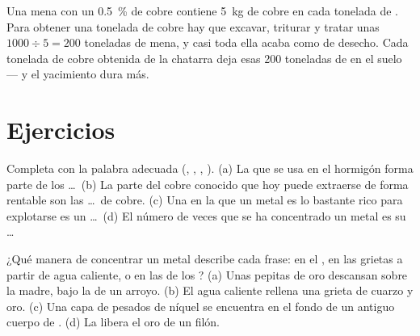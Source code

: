 \begin{example}\label{ex:g9:earth-resources:recycling}
Una mena con un \qty{0.5}{\%} de cobre contiene \qty{5}{kg} de cobre en
cada tonelada de . Para obtener una tonelada de cobre hay que
excavar, triturar y tratar unas $1000 \div 5 = 200$ toneladas de mena, y
casi toda ella acaba como  de desecho. Cada tonelada de cobre obtenida
de la chatarra deja esas 200 toneladas de  en el suelo --- y el
yacimiento dura más.
\end{example}


\section{Ejercicios}

\begin{exercise}[$\star$]\label{exo:g9:earth-resources:1}
Completa con la palabra adecuada (, , , ). (a) La  que se usa en el hormigón
forma parte de los \ldots\ (b) La parte del cobre conocido que hoy puede
extraerse de forma rentable son las \ldots\ de cobre. (c) Una  en la
que un metal es lo bastante rico para explotarse es un \ldots\ (d) El
número de veces que se ha concentrado un metal es su \ldots
\end{exercise}

\begin{exercise}[$\star$]\label{exo:g9:earth-resources:2}
¿Qué manera de concentrar un metal describe cada frase: en el , en
las grietas a partir de agua caliente, o en las  de los ?
(a) Unas pepitas de oro descansan sobre la  madre, bajo la  de un
arroyo. (b) El agua caliente rellena una grieta de cuarzo y oro. (c) Una
capa de  pesados de níquel se encuentra en el fondo de un antiguo
cuerpo de . (d) La  libera el oro de un filón.
\end{exercise}


